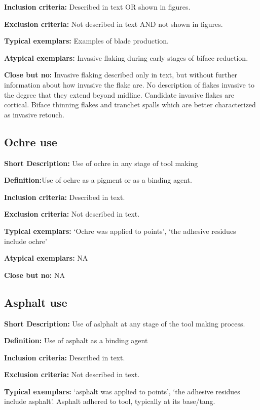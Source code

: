 \documentclass[
]{article}
\begin{document}
\textbf{Inclusion criteria:} Described in text OR shown in figures.

\textbf{Exclusion criteria:} Not described in text AND not shown in
figures.

\textbf{Typical exemplars:} Examples of blade production.

\textbf{Atypical exemplars:} Invasive flaking during early stages of
biface reduction.

\textbf{Close but no:} Invasive flaking described only in text, but
without further information about how invasive the flake are. No
description of flakes invasive to the degree that they extend beyond
midline. Candidate invasive flakes are cortical. Biface thinning flakes
and tranchet spalls which are better characterized as invasive retouch.

\subsection{Ochre use}\label{ochre-use}

\textbf{Short Description:} Use of ochre in any stage of tool making

\textbf{Definition:}Use of ochre as a pigment or as a binding agent.

\textbf{Inclusion criteria:} Described in text.

\textbf{Exclusion criteria:} Not described in text.

\textbf{Typical exemplars:} `Ochre was applied to points', `the adhesive
residues include ochre'

\textbf{Atypical exemplars:} NA

\textbf{Close but no:} NA

\subsection{Asphalt use}\label{asphalt-use}

\textbf{Short Description:} Use of aslphalt at any stage of the tool
making process.

\textbf{Definition:} Use of asphalt as a binding agent

\textbf{Inclusion criteria:} Described in text.

\textbf{Exclusion criteria:} Not described in text.

\textbf{Typical exemplars:} `asphalt was applied to points', `the
adhesive residues include asphalt'. Asphalt adhered to tool, typically
at its base/tang.
\end{document}
